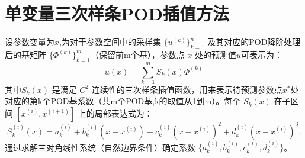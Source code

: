\section{单变量三次样条POD插值方法}
设参数变量为\(x\),为对于参数空间中的采样集 \(\{u^{(k)}\}_{k=1}^n\) 及其对应的POD降阶处理后的基矩阵 \(\{\Phi^{(k)}\}_{k=1}^m\)（保留前m个基），参数点 \(x\) 处的预测值\(u\)可表示为：
 \begin{equation}
    u(x) = \sum_{k=1}^{m} S_k(x) \Phi^{(k)}
    \end{equation}
其中\(S_k(x)\) 是满足 \(C^2\) 连续性的三次样条插值函数，用来表示待预测参数点\(x^*\)处对应的第k个POD基系数（共m个POD基,k的取值从1到m）。每个 \(S_k(x)\) 在子区间 \([x^{(i)}, x^{(i+1)}]\) 上的局部表达式为：
\begin{equation}
S_k^{(i)}(x) = a_k^{(i)} + b_k^{(i)} (x - x^{(i)}) + c_k^{(i)} (x - x^{(i)})^2 + d_k^{(i)} (x - x^{(i)})^3.
\end{equation}
通过求解三对角线性系统（自然边界条件）确定系数 \(\{a_k^{(i)}, b_k^{(i)}, c_k^{(i)}, d_k^{(i)}\}\)。

